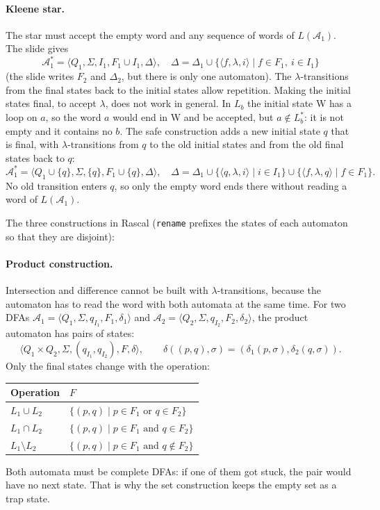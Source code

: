 \paragraph{Kleene star.} The star must accept the empty word and any sequence
of words of $L(\mathcal{A}_1)$. The slide gives
\[
\mathcal{A}_1^* = \langle Q_1, \Sigma, I_1, F_1 \cup I_1, \Delta \rangle,
\quad
\Delta = \Delta_1 \cup \{ \langle f, \lambda, i \rangle \mid f \in F_1,\ i \in I_1 \}
\]
(the slide writes $F_2$ and $\Delta_2$, but there is only one automaton). The
$\lambda$-transitions from the final states back to the initial states allow
repetition. Making the initial states final, to accept $\lambda$, does not work
in general. In $L_b$ the initial state W has a loop on $a$, so the word $a$
would end in W and be accepted, but $a \notin L_b^*$: it is not empty and it
contains no $b$. The safe construction adds a new initial state $q$ that is
final, with $\lambda$-transitions from $q$ to the old initial states and from the
old final states back to $q$:
\[
\mathcal{A}_1^* = \langle Q_1 \cup \{q\}, \Sigma, \{q\}, F_1 \cup \{q\}, \Delta \rangle,
\quad
\Delta = \Delta_1 \cup \{ \langle q, \lambda, i \rangle \mid i \in I_1 \} \cup \{ \langle f, \lambda, q \rangle \mid f \in F_1 \}.
\]
No old transition enters $q$, so only the empty word ends there without
reading a word of $L(\mathcal{A}_1)$.

The three constructions in Rascal (\texttt{rename} prefixes the states of each
automaton so that they are disjoint):

\paragraph{Product construction.} Intersection and difference cannot be built
with $\lambda$-transitions, because the automaton has to read the word with both
automata at the same time. For two DFAs $\mathcal{A}_1 = \langle Q_1, \Sigma,
q_{I_1}, F_1, \delta_1 \rangle$ and $\mathcal{A}_2 = \langle Q_2, \Sigma, q_{I_2},
F_2, \delta_2 \rangle$, the product automaton has pairs of states:
\[
\langle Q_1 \times Q_2, \Sigma, (q_{I_1}, q_{I_2}), F, \delta \rangle,
\qquad
\delta((p, q), \sigma) = (\delta_1(p, \sigma), \delta_2(q, \sigma)).
\]
Only the final states change with the operation:
\begin{center}
\begin{tabular}{l l}
  \toprule
  Operation & $F$ \\
  \midrule
  $L_1 \cup L_2$          & $\{ (p, q) \mid p \in F_1 \text{ or } q \in F_2 \}$ \\
  $L_1 \cap L_2$          & $\{ (p, q) \mid p \in F_1 \text{ and } q \in F_2 \}$ \\
  $L_1 \setminus L_2$     & $\{ (p, q) \mid p \in F_1 \text{ and } q \notin F_2 \}$ \\
  \bottomrule
\end{tabular}
\end{center}
Both automata must be complete DFAs: if one of them got stuck, the pair would
have no next state. That is why the set construction keeps the empty set as a
trap state.

